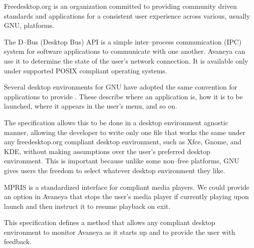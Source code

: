 

Freedesktop.org is an organization committed to providing community driven standards and applications for a consistent user experience across various, usually GNU, platforms.

\startitemize[4]

The D--Bus (Desktop Bus) API is a simple inter--process communication (IPC) system for software applications to communicate with one another. Avaneya can use it to determine the state of the user's network connection. It is available only under supported POSIX compliant operating systems.


Several desktop environments for GNU have adopted the same convention for applications to provide . These describe where an application is, how it is to be launched, where it appears in the user's menu, and so on. 

The specification allows this to be done in a desktop environment agnostic manner, allowing the developer to write only one file that works the same under any freedesktop.org compliant desktop environment, such as Xfce, Gnome, and KDE, without making assumptions over the user's preferred desktop environment. This is important because unlike some non--free platforms, GNU gives users the freedom to select whatever desktop environment they like.


MPRIS is a standardized interface for compliant media players. We could provide an option in Avaneya that stops the user's media player if currently playing upon launch and then instruct it to resume playback on exit.


This specification defines a method that allows any compliant desktop environment to monitor Avaneya as it starts up and to provide the user with feedback.
\stopitemize

